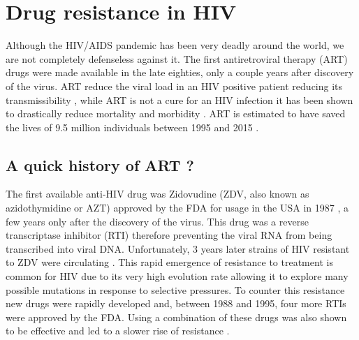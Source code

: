 \documentclass[
  11pt,
  twoside]{scrbook}
\begin{document}
\hypertarget{drug-resistance-in-hiv}{%
\section{Drug resistance in HIV}\label{drug-resistance-in-hiv}}

Although the HIV/AIDS pandemic has been very deadly around the world, we are not completely defenseless against it. The first antiretroviral therapy (ART) drugs were made available in the late eighties, only a couple years after discovery of the virus. ART reduce the viral load in an HIV positive patient reducing its transmissibility \autocite{eisingerHIVViralLoad2019}, while ART is not a cure for an HIV infection it has been shown to drastically reduce mortality and morbidity \autocite{palellaDecliningMorbidityMortality1998}. ART is estimated to have saved the lives of 9.5 million individuals between 1995 and 2015 \autocite{forsytheTwentyYearsAntiretroviral2019}.

\hypertarget{a-quick-history-of-art}{%
\subsection{A quick history of ART ?}\label{a-quick-history-of-art}}

The first available anti-HIV drug was Zidovudine (ZDV, also known as azidothymidine or AZT) approved by the FDA for usage in the USA in 1987 \autocite{fischlEfficacyAzidothymidineAZT1987}, a few years only after the discovery of the virus. This drug was a reverse transcriptase inhibitor (RTI) therefore preventing the viral RNA from being transcribed into viral DNA. Unfortunately, 3 years later strains of HIV resistant to ZDV were circulating \autocite{richmanSusceptibilityNucleosideAnalogues1990}. This rapid emergence of resistance to treatment is common for HIV \autocite{yeoDeterminationHIV1RT2020} due to its very high evolution rate \autocite{cuevasExtremelyHighMutation2015} allowing it to explore many possible mutations in response to selective pressures. To counter this resistance new drugs were rapidly developed and, between 1988 and 1995, four more RTIs were approved by the FDA. Using a combination of these drugs was also shown to be effective and led to a slower rise of resistance \autocite{gulickTreatmentIndinavirZidovudine1997}.
\end{document}
